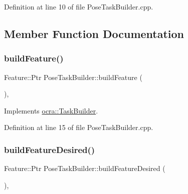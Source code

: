 Definition at line 10 of file Pose\+Task\+Builder.\+cpp.



\subsection{Member Function Documentation}
\hypertarget{classocra_1_1PoseTaskBuilder_a9a5cd51010fb610f00eea794e1f8f701}{}\label{classocra_1_1PoseTaskBuilder_a9a5cd51010fb610f00eea794e1f8f701} 
\subsubsection{\texorpdfstring{build\+Feature()}{buildFeature()}}
{\footnotesize\ttfamily Feature\+::\+Ptr Pose\+Task\+Builder\+::build\+Feature (\begin{DoxyParamCaption}{ }\end{DoxyParamCaption})\hspace{0.3cm}{\ttfamily [protected]}, {\ttfamily [virtual]}}



Implements \hyperlink{classocra_1_1TaskBuilder_a58c0dc416a9607a344a080248ee26ac2}{ocra\+::\+Task\+Builder}.



Definition at line 15 of file Pose\+Task\+Builder.\+cpp.

\hypertarget{classocra_1_1PoseTaskBuilder_a66fa4cdba48138741e19e642684a7006}{}\label{classocra_1_1PoseTaskBuilder_a66fa4cdba48138741e19e642684a7006} 
\subsubsection{\texorpdfstring{build\+Feature\+Desired()}{buildFeatureDesired()}}
{\footnotesize\ttfamily Feature\+::\+Ptr Pose\+Task\+Builder\+::build\+Feature\+Desired (\begin{DoxyParamCaption}{ }\end{DoxyParamCaption})\hspace{0.3cm}{\ttfamily [protected]}, {\ttfamily [virtual]}}



